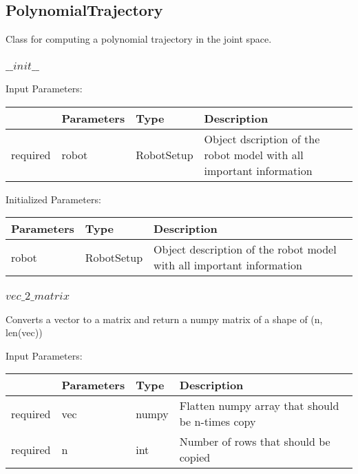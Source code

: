\documentclass[
	ngerman,
	accentcolor=9c,%
	type=intern,
	marginpar=false
	]{tudapub}
\begin{document}
\subsection{PolynomialTrajectory}
\noindent Class for computing a polynomial trajectory in the joint space.

\vspace{0.5cm}
\subsubsection{$\_\_init\_\_$}
\noindent Input Parameters:
\vspace{0.5cm}

\begin{tabular}{|p{}|p{}|p{}| p{}|}
\hline
 & \textbf{Parameters} & \textbf{Type} & \textbf{Description} \\
\hline
required & robot & RobotSetup & Object dscription of the robot model with all important information \\
\hline
\end{tabular}
\vspace{0.5cm}

 


\noindent Initialized Parameters:


\vspace{0.5cm}
\begin{tabular}{|p{}| p{}| p{}|}
\hline
\textbf{Parameters} & \textbf{Type} & \textbf{Description} \\
\hline
robot & RobotSetup & Object description of the robot model with all important information \\
\hline
\end{tabular}

\vspace{1cm}


\subsubsection{$vec\_2\_matrix$}
\noindent Converts a vector to a matrix and return a numpy matrix of a shape of (n, len(vec))

\vspace{0.5cm}
\noindent Input Parameters:
\vspace{0.5cm}

\begin{tabular}{|p{}|p{}|p{}| p{}|}
\hline
 & \textbf{Parameters} & \textbf{Type} & \textbf{Description} \\
\hline
required & vec & numpy & Flatten numpy array that should be n-times copy\\
\hline
required & n & int & Number of rows that should be copied\\
\hline
\end{tabular}
\vspace{1cm}
\end{document}
